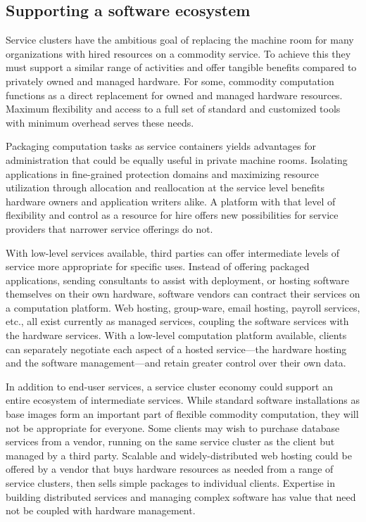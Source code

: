 \subsection{Supporting a software ecosystem}

Service clusters have the ambitious goal of replacing the machine room for many organizations with hired resources on a commodity service. To achieve this they must support a similar range of activities and offer tangible benefits compared to privately owned and managed hardware. For some, commodity computation functions as a direct replacement for owned and managed hardware resources. Maximum flexibility and access to a full set of standard and customized tools with minimum overhead serves these needs.

Packaging computation tasks as service containers yields advantages for administration that could be equally useful in private machine rooms. Isolating applications in fine-grained protection domains and maximizing resource utilization through allocation and reallocation at the service level benefits hardware owners and application writers alike. A platform with that level of flexibility and control as a resource for hire offers new possibilities for service providers that narrower service offerings do not.

With low-level services available, third parties can offer intermediate levels of service more appropriate for specific uses. Instead of offering packaged applications, sending consultants to assist with deployment, or hosting software themselves on their own hardware, software vendors can contract their services on a computation platform. Web hosting, group-ware, email hosting, payroll services, etc., all exist currently as managed services, coupling the software services with the hardware services. With a low-level computation platform available, clients can separately negotiate each aspect of a hosted service---the hardware hosting and the software management---and retain greater control over their own data.

In addition to end-user services, a service cluster economy could support an entire ecosystem of intermediate services. While standard software installations as base images form an important part of flexible commodity computation, they will not be appropriate for everyone. Some clients may wish to purchase database services from a vendor, running on the same service cluster as the client but managed by a third party. Scalable and widely-distributed web hosting could be offered by a vendor that buys hardware resources as needed from a range of service clusters, then sells simple packages to individual clients. Expertise in building distributed services and managing complex software has value that need not be coupled with hardware management.

